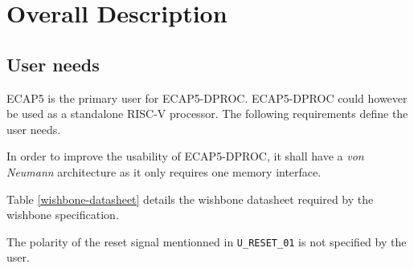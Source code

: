 \section{Overall Description}

\subsection{User needs}

\label{user-needs}

\begin{content}
ECAP5 is the primary user for ECAP5-DPROC. ECAP5-DPROC could however be used as a standalone RISC-V processor. The following requirements define the user needs. 
\end{content}


\begin{content}
  In order to improve the usability of ECAP5-DPROC, it shall have a \textit{von Neumann} architecture as it only requires one memory interface.
\end{content}




\begin{content}
  Table \ref{wishbone-datasheet} details the wishbone datasheet required by the wishbone specification.
\end{content}



\vspace{0.5em}


\begin{content}
The polarity of the reset signal mentionned in \texttt{U\_RESET\_01} is not specified by the user.
\end{content}

